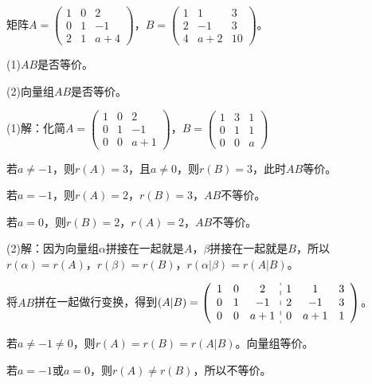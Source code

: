 \documentclass[UTF8, 12pt]{ctexart}
\begin{document}
矩阵$A=\left(\begin{array}{ccc}
    1 & 0 & 2 \\
    0 & 1 & -1 \\
    2 & 1 & a+4
\end{array}\right)$，$B=\left(\begin{array}{ccc}
    1 & 1 & 3 \\
    2 & -1 & 3 \\
    4 & a+2 & 10
\end{array}\right)$。\medskip

(1)$AB$是否等价。

(2)向量组$AB$是否等价。

(1)解：化简$A=\left(\begin{array}{ccc}
    1 & 0 & 2 \\
    0 & 1 & -1 \\
    0 & 0 & a+1
\end{array}\right)$，$B=\left(\begin{array}{ccc}
    1 & 3 & 1 \\
    0 & 1 & 1 \\
    0 & 0 & a
\end{array}\right)$

若$a\neq-1$，则$r(A)=3$，且$a\neq0$，则$r(B)=3$，此时$AB$等价。

若$a=-1$，则$r(A)=2$，$r(B)=3$，$AB$不等价。

若$a=0$，则$r(B)=2$，$r(A)=2$，$AB$不等价。

(2)解：因为向量组$\alpha$拼接在一起就是$A$，$\beta$拼接在一起就是$B$，所以$r(\alpha)=r(A)$，$r(\beta)=r(B)$，$r(\alpha|\beta)=r(A|B)$。

将$AB$拼在一起做行变换，得到$(A|B)=\left(\begin{array}{c:c}
    \begin{matrix}
        1 & 0 & 2 \\
        0 & 1 & -1 \\
        0 & 0 & a+1
    \end{matrix}&
    \begin{matrix}
        1 & 1 & 3 \\
        2 & -1 & 3 \\
        0 & a+1 & 1
    \end{matrix}
\end{array}\right)$。\medskip

若$a\neq-1\neq0$，则$r(A)=r(B)=r(A|B)$。向量组等价。

若$a=-1$或$a=0$，则$r(A)\neq r(B)$，所以不等价。
\end{document}
